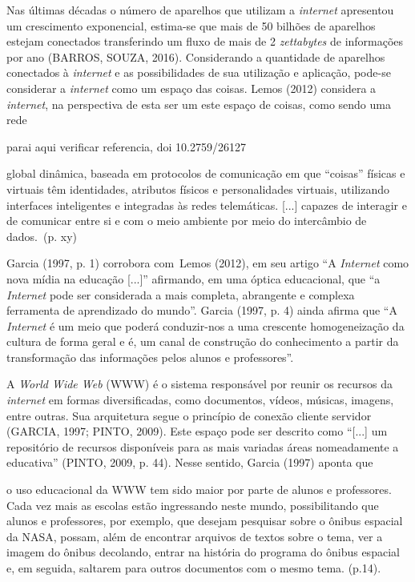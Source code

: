 \documentclass{IFNMG}
\begin{document}
Nas últimas décadas o número de aparelhos que utilizam a \textit{internet} apresentou um crescimento exponencial, estima-se que mais de 50 bilhões de aparelhos estejam conectados transferindo um fluxo de mais de 2 \textit{zettabytes} de informações por ano (BARROS, SOUZA, 2016). Considerando a quantidade de aparelhos conectados à \textit{internet} e as possibilidades de sua utilização e aplicação, pode-se considerar a \textit{internet} como um espaço das coisas. Lemos (2012) considera a \textit{internet}, na perspectiva de esta ser um este espaço de coisas, como sendo uma rede  

parai aqui
verificar referencia, doi 10.2759/26127
 
\begin{CitacaoLonga} 
global dinâmica, baseada em protocolos de comunicação em que “coisas” físicas e virtuais têm identidades, atributos físicos e personalidades virtuais, utilizando interfaces inteligentes e integradas às redes telemáticas. [...] capazes de interagir e de comunicar entre si e com o meio ambiente por meio do intercâmbio de dados. (p. xy)
\end{CitacaoLonga}

Garcia (1997, p. 1) corrobora com Lemos (2012), em seu artigo “A \textit{Internet} como nova mídia na educação [...]” afirmando, em uma óptica educacional, que “a \textit{Internet} pode ser considerada a mais completa, abrangente e complexa ferramenta de aprendizado do mundo”. Garcia (1997, p. 4) ainda afirma que “A \textit{Internet} é um meio que poderá conduzir-nos a uma crescente homogeneização da cultura de forma geral e é, um canal de construção do conhecimento a partir da transformação das informações pelos alunos e professores”.

 
A \textit{World Wide Web} (WWW) é o sistema responsável por reunir os recursos da \textit{internet} em formas diversificadas, como documentos, vídeos, músicas, imagens, entre outras. Sua arquitetura segue o princípio de conexão cliente servidor (GARCIA, 1997; PINTO, 2009). Este espaço pode ser descrito como “[...] um repositório de recursos disponíveis para as mais variadas áreas nomeadamente a educativa” (PINTO, 2009, p. 44). Nesse sentido, Garcia (1997) aponta que

\begin{CitacaoLonga} 
o uso educacional da WWW tem sido maior por parte de alunos e professores. Cada vez mais as escolas estão ingressando neste mundo, possibilitando que alunos e professores, por exemplo, que desejam pesquisar sobre o ônibus espacial da NASA, possam, além de encontrar arquivos de textos sobre o tema, ver a imagem do ônibus decolando, entrar na história do programa do ônibus espacial e, em seguida, saltarem para outros documentos com o mesmo tema. (p.14).
\end{CitacaoLonga}
\end{document}
